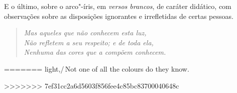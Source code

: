 {{{{{{{{{{{{{{{{{{E o último, sobre o arco"-íris, em \textit{versos brancos}, de caráter
didático, com observações sobre as disposições ignorantes e irrefletidas
de certas pessoas.

\begin{verse}
\textit{Mas aqueles que não conhecem esta luz,\\
Não refletem a seu respeito; e de toda ela,\\
Nenhuma das cores que a compõem conhecem.}\footnotemark
\end{verse}
=======
  light,/\,Not one of all the colours do they know.} 
>>>>>>> 7ef31cc2a6d5603f856fee4c85bc83700040648c

}}}}}}}}}}}}}}}}}

